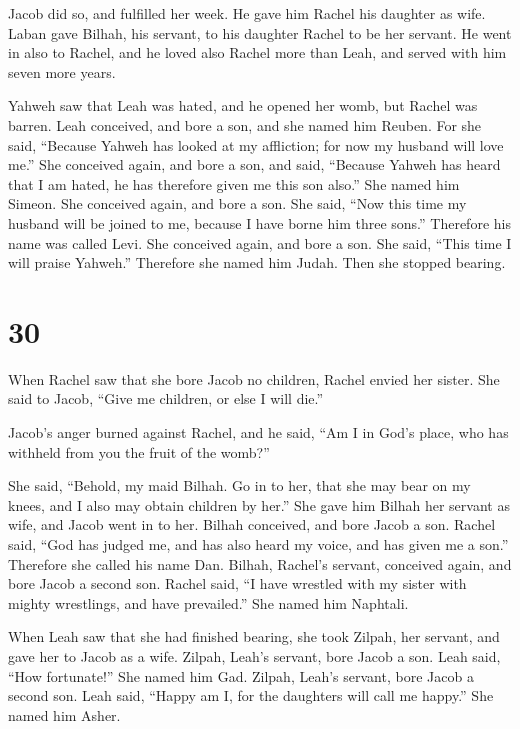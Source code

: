  Jacob did so, and fulfilled her week. He gave him Rachel
his daughter as wife.  Laban gave Bilhah, his servant, to
his daughter Rachel to be her servant.  He went in also to
Rachel, and he loved also Rachel more than Leah, and served with him
seven more years.

 Yahweh saw that Leah was hated, and he opened her womb,
but Rachel was barren.  Leah conceived, and bore a son, and
she named him Reuben. For she said, ``Because Yahweh has looked at my
affliction; for now my husband will love me.''  She
conceived again, and bore a son, and said, ``Because Yahweh has heard
that I am hated, he has therefore given me this son also.'' She named
him Simeon.  She conceived again, and bore a son. She said,
``Now this time my husband will be joined to me, because I have borne
him three sons.'' Therefore his name was called Levi.  She
conceived again, and bore a son. She said, ``This time I will praise
Yahweh.'' Therefore she named him Judah. Then she stopped bearing.

\hypertarget{section-29}{%
\section{30}\label{section-29}}

 When Rachel saw that she bore Jacob no children, Rachel
envied her sister. She said to Jacob, ``Give me children, or else I will
die.''

 Jacob's anger burned against Rachel, and he said, ``Am I in
God's place, who has withheld from you the fruit of the womb?''

 She said, ``Behold, my maid Bilhah. Go in to her, that she
may bear on my knees, and I also may obtain children by her.''
 She gave him Bilhah her servant as wife, and Jacob went in
to her.  Bilhah conceived, and bore Jacob a son.
 Rachel said, ``God has judged me, and has also heard my
voice, and has given me a son.'' Therefore she called his name Dan.
 Bilhah, Rachel's servant, conceived again, and bore Jacob a
second son.  Rachel said, ``I have wrestled with my sister
with mighty wrestlings, and have prevailed.'' She named him Naphtali.

 When Leah saw that she had finished bearing, she took
Zilpah, her servant, and gave her to Jacob as a wife. 
Zilpah, Leah's servant, bore Jacob a son.  Leah said, ``How
fortunate!'' She named him Gad.  Zilpah, Leah's servant,
bore Jacob a second son.  Leah said, ``Happy am I, for the
daughters will call me happy.'' She named him Asher.

